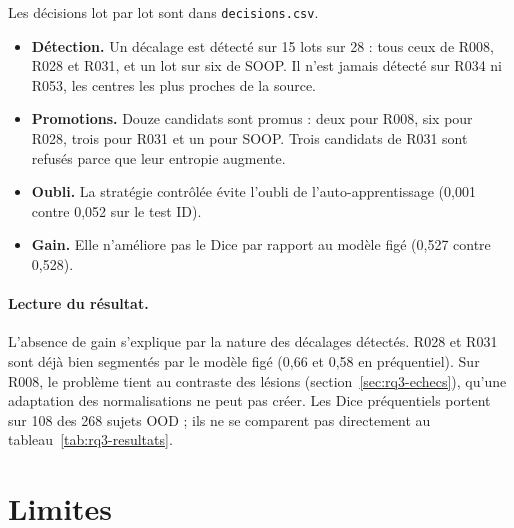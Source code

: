 Les décisions lot par lot sont dans \nolinkurl{decisions.csv}.
\begin{itemize}
  \item \textbf{Détection.} Un décalage est détecté sur 15 lots sur 28 : tous ceux de R008, R028 et R031, et un lot sur six de SOOP. Il n'est jamais détecté sur R034 ni R053, les centres les plus proches de la source.
  \item \textbf{Promotions.} Douze candidats sont promus : deux pour R008, six pour R028, trois pour R031 et un pour SOOP. Trois candidats de R031 sont refusés parce que leur entropie augmente.
  \item \textbf{Oubli.} La stratégie contrôlée évite l'oubli de l'auto-apprentissage (0,001 contre 0,052 sur le test ID).
  \item \textbf{Gain.} Elle n'améliore pas le Dice par rapport au modèle figé (0,527 contre 0,528).
\end{itemize}

\paragraph{Lecture du résultat.}
L'absence de gain s'explique par la nature des décalages détectés.
R028 et R031 sont déjà bien segmentés par le modèle figé (0,66 et 0,58 en préquentiel).
Sur R008, le problème tient au contraste des lésions (section~\ref{sec:rq3-echecs}), qu'une adaptation des normalisations ne peut pas créer.
Les Dice préquentiels portent sur 108 des 268 sujets OOD ; ils ne se comparent pas directement au tableau~\ref{tab:rq3-resultats}.

\section{Limites}
\label{sec:rq3-limites}

